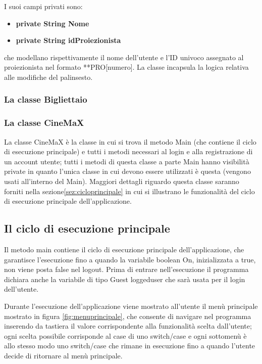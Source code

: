 \documentclass[a4paper,titlepage,openany,12pt]{book}
\begin{document}
I suoi campi privati sono:

\begin{center}
\begin{varwidth}{\textwidth}
\begin{itemize}
\item[•] \textbf{private String Nome} 
\item[•] \textbf{private String idProiezionista}
\end{itemize}
\end{varwidth}
\end{center}

che modellano rispettivamente il nome dell'utente e l'ID univoco assegnato al proiezionista nel formato **PRO[numero].
La classe incapsula la logica relativa alle modifiche del palinsesto.



\subsubsection{La classe Bigliettaio}\label{subsubsec:Bigliettaio}

\subsubsection{La classe CineMaX}\label{subsubsec:CineMaX}
La classe CineMaX è la classe in cui si trova il metodo Main (che contiene il ciclo di esecuzione principale) e tutti i metodi necessari al login e alla registrazione di un account utente; tutti i metodi di questa classe a parte Main hanno visibilità private in quanto l'unica classe in cui devono essere utilizzati è questa (vengono usati all'interno del Main). Maggiori dettagli riguardo questa classe saranno forniti nella sezione\ref{sez:cicloprincipale} in cui si illustrano le funzionalità del ciclo di esecuzione principale dell'applicazione.


\subsection{Il ciclo di esecuzione principale}
Il metodo main contiene il ciclo di esecuzione principale dell'applicazione, che garantisce l'esecuzione fino a quando la variabile boolean On, inizializzata a true, non viene posta false nel logout. Prima di entrare nell'esecuzione il programma dichiara anche la variabile di tipo Guest loggeduser che sarà usata per il login dell'utente.

\label{sez:cicloprincipale}
Durante l'esecuzione dell'applicazione viene mostrato all'utente il menù principale mostrato in figura \ref{fig:menuprincipale}, che consente di navigare nel programma inserendo da tastiera il valore corrispondente alla funzionalità scelta dall'utente; ogni scelta possibile corrisponde al case di uno switch/case e ogni sottomenù è allo stesso modo uno switch/case che rimane in esecuzione fino a quando l'utente decide di ritornare al menù principale.
\end{document}
